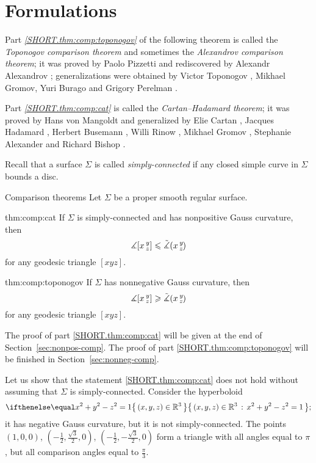 \section{Formulations}

Part \textit{\ref{SHORT.thm:comp:toponogov}} of the following theorem is called the {}\emph{Toponogov comparison theorem} and sometimes the {}\emph{Alexandrov comparison theorem};
it was proved by Paolo Pizzetti \cite{pizzetti} and rediscovered by Alexandr Alexandrov \cite{aleksandrov}; 
generalizations were obtained by  Victor Toponogov \cite{toponogov1957}, Mikhael Gromov, Yuri Burago and Grigory Perelman \cite{burago-gromov-perelman}.

Part \textit{\ref{SHORT.thm:comp:cat}} is called the {}\emph{Cartan--Hadamard theorem};
it was proved by 
Hans von Mangoldt \cite{mangoldt} and generalized by Elie Cartan \cite{cartan}, Jacques Hadamard \cite{hadamard},
Herbert Busemann \cite{busemann},
Willi Rinow \cite{rinow},
Mikhael Gromov \cite[p.~119]{gromov-1987},
Stephanie Alexander and Richard Bishop \cite{alexander-bishop1990}.

Recall that a surface $\Sigma$ is called {}\emph{simply-connected} if any closed simple curve in $\Sigma$ bounds a disc.

\begin{thm}{Comparison theorems}
\label{thm:comp}
Let $\Sigma$ be a proper smooth regular surface.

\begin{subthm}{thm:comp:cat}
If $\Sigma$ is simply-connected and has nonpositive Gauss curvature,
 then 
\[\measuredangle[x\,{}^{y}_{z}]\leqslant\tilde\measuredangle(x\,{}^{y}_{z}\hspace{-0.2ex})\]
for any geodesic triangle $[xyz]$.
\end{subthm}

\begin{subthm}{thm:comp:toponogov}
If $\Sigma$ has nonnegative Gauss curvature, then 
 \[\measuredangle[x\,{}^{y}_{z}]\geqslant\tilde\measuredangle(x\,{}^{y}_{z}\hspace{-0.2ex})\]
for any geodesic triangle $[xyz]$.
\end{subthm}

\end{thm}

The proof of part \ref{SHORT.thm:comp:cat} will be given at the end of Section~\ref{sec:nonpos-comp}.
The proof of part \ref{SHORT.thm:comp:toponogov} will be finished in  Section~\ref{sec:nonneg-comp}.

Let us show that the statement \ref{SHORT.thm:comp:cat} does not hold without assuming that $\Sigma$ is simply-connected.
Consider the hyperboloid
\[\set{(x,y,z)\in\mathbb{R}^3}{x^2+y^2-z^2=1};\]
it has negative Gauss curvature, but it is not simply-connected.
The points $(1,0,0)$, $(-\tfrac{1}2, \tfrac{\sqrt{3} }2, 0)$, $(-\tfrac{1}2, -\tfrac{\sqrt{3} }2, 0)$
form a triangle with all angles equal to $\pi$, but all comparison angles equal to $\tfrac{\pi}3$.

